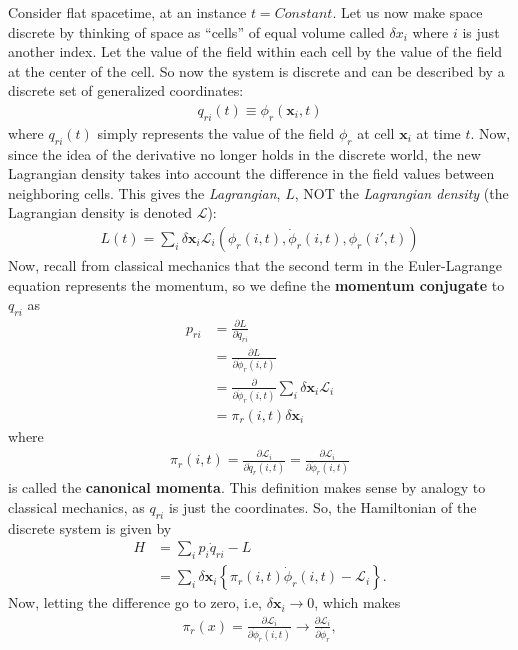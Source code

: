 \documentclass{book}
\numberwithin{equation}{section}
\theoremstyle{definition}
\newcommand{\p}{\partial}
\newcommand{\lag}{\mathcal{L}}
\begin{document}
Consider flat spacetime, at an instance $t = Constant$. Let us now make space discrete by thinking of space as ``cells'' of equal volume called $\delta x_i$ where $i$ is just another index. Let the value of the field within each cell by the value of the field at the center of the cell. So now the system is discrete and can be described by a discrete set of generalized coordinates:
\begin{align}
q_{ri}(t) \equiv \phi_r(\mathbf{x}_i, t)
\end{align} 
where $q_{ri}(t)$ simply represents the value of the field $\phi_r$ at cell $\mathbf{x}_i$ at time $t$. Now, since the idea of the derivative no longer holds in the discrete world, the new Lagrangian density takes into account the difference in the field values between neighboring cells. This gives the \textit{Lagrangian}, $L$, NOT the \textit{Lagrangian density} (the Lagrangian density is denoted $\lag$):
\begin{align}
L(t) = \sum_{i} \delta \mathbf{x}_i \lag_i (\phi_r(i,t), \dot{\phi}_r(i,t), \phi_r(i',t))
\end{align} 
Now, recall from classical mechanics that the second term in the Euler-Lagrange equation represents the momentum, so we define the \textbf{momentum conjugate} to $q_{ri}$ as
\begin{align}
p_{ri} &= \frac{\p L}{\p \dot{q}_{ri}}\\
&= \frac{\p L}{\p \dot{\phi}_r(i,t)}\\
&= \frac{\p}{\p \dot{\phi}_r(i,t)}\sum_{i} \delta \mathbf{x}_i \lag_i \\
&= \pi_r(i,t)\delta \mathbf{x}_i
\end{align}
where 
\begin{align}
\pi_r(i,t) = \frac{\p\lag_i}{\p \dot{q}_r(i,t)} =\frac{\p\lag_i}{\p \dot{\phi}_r(i,t)}
\end{align}
is called the \textbf{canonical momenta}. This definition makes sense by analogy to classical mechanics, as $q_{ri}$ is just the coordinates. So, the Hamiltonian of the discrete system is given by
\begin{align}
H &= \sum_{i}p_{i}\dot{q}_{ri} - L\\
&= \sum_{i}\delta\mathbf{x}_i \left\{\pi_r(i,t)\dot{\phi}_r(i,t) - \lag_i \right\}.
\end{align}
Now, letting the difference go to zero, i.e, $\delta \mathbf{x}_i \to 0$, which makes
\begin{align}
\pi_r(x) = \frac{\p\lag_i}{\p \dot{\phi}_r(i,t)} \to \frac{\p\lag_i}{\p \dot{\phi}_r},
\end{align}
\end{document}
